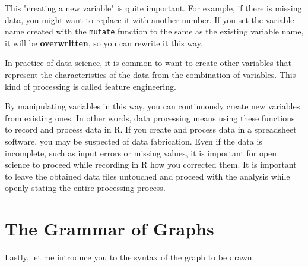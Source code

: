 \documentclass{ltjsbook}
\begin{document}
This "creating a new variable" is quite important. For example, if there is missing data, you might want to replace it with another number. If you set the variable name created with the \verb|mutate| function to the same as the existing variable name, it will be \textbf{overwritten}, so you can rewrite it this way.

In practice of data science, it is common to want to create other variables that represent the characteristics of the data from the combination of variables. This kind of processing is called feature engineering.

By manipulating variables in this way, you can continuously create new variables from existing ones. In other words, data processing means using these functions to record and process data in R. If you create and process data in a spreadsheet software, you may be suspected of data fabrication. Even if the data is incomplete, such as input errors or missing values, it is important for open science to proceed while recording in R how you corrected them.  It is important to leave the obtained data files untouched and proceed with the analysis while openly stating the entire processing process.

\section{The Grammar of Graphs}
Lastly, let me introduce you to the syntax of the graph to be drawn.
\end{document}
